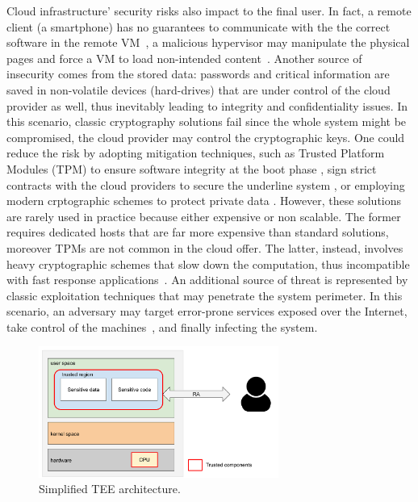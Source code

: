 Cloud infrastructure' security risks also impact to the final 
user. In fact, a remote client (\eg a smartphone) has no guarantees to 
communicate with the the correct software in the remote 
VM~\citep{beekman2016attestation}, \eg a malicious hypervisor may manipulate 
the physical pages and force a VM to load non-intended 
content~\citep{10.1145/3292006.3300022}.
Another source of insecurity comes from the stored data: passwords and critical 
information are saved in non-volatile devices (\ie hard-drives) that are under 
control of the cloud provider as well, thus inevitably leading to integrity and 
confidentiality issues.
In this scenario, classic cryptography solutions fail since the whole system 
might be compromised, \ie the cloud provider may control the cryptographic keys.
%
One could reduce the risk by adopting mitigation techniques, such as 
Trusted Platform Modules (TPM) to ensure software integrity at the boot phase 
\citep{tpm-isoosi}, sign strict contracts with the cloud providers to secure 
the underline system \citep{aws_dedicated_host}, or employing modern 
crptographic schemes to protect private data \citep{gentry2009fully}.
%
However, these solutions are rarely used in practice because either expensive 
or non scalable. The former requires dedicated hosts that are far more 
expensive than standard solutions, moreover TPMs are not common in the cloud 
offer. 
The latter, instead, involves heavy cryptographic schemes that slow down the 
computation, thus incompatible with fast response 
applications~\citep{10.1145/2046660.2046682}.
%
An additional source of threat is represented by classic exploitation 
techniques that may penetrate the system perimeter.
In this scenario, an adversary may target error-prone services exposed over the 
Internet, take control of the
machines~\citep{van2012memory,10.1145/2810103.2813646}, and finally infecting 
the system.


\begin{figure}[t]
	\centering
	\includegraphics[width=0.7\textwidth]{fig_c1/sgx-architecture.pdf}
	\caption[SGX architecture.]{Simplified TEE architecture.}
	\label{fig:sgx-architecture}
\end{figure}

